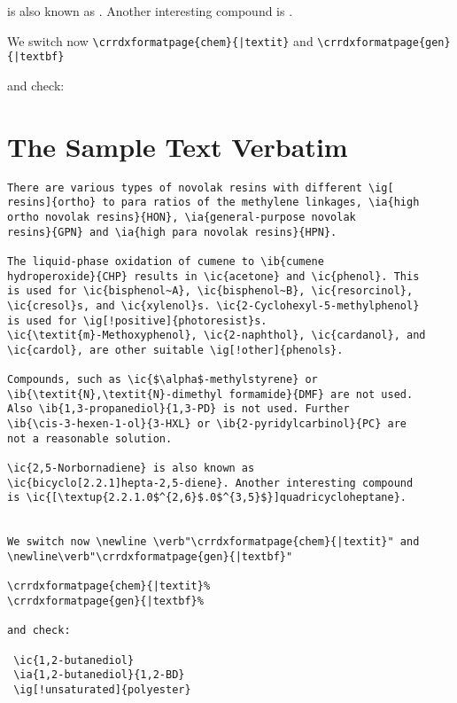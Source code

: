 \documentclass{book}
\begin{document}
 is also known as
. Another interesting compound
is .


We switch now \newline \verb"\crrdxformatpage{chem}{|textit}" and
\newline\verb"\crrdxformatpage{gen}{|textbf}"

%
%

and check:



\section{The Sample Text Verbatim}

\begin{verbatim}
There are various types of novolak resins with different \ig[
resins]{ortho} to para ratios of the methylene linkages, \ia{high
ortho novolak resins}{HON}, \ia{general-purpose novolak
resins}{GPN} and \ia{high para novolak resins}{HPN}.

The liquid-phase oxidation of cumene to \ib{cumene
hydroperoxide}{CHP} results in \ic{acetone} and \ic{phenol}. This
is used for \ic{bisphenol~A}, \ic{bisphenol~B}, \ic{resorcinol},
\ic{cresol}s, and \ic{xylenol}s. \ic{2-Cyclohexyl-5-methylphenol}
is used for \ig[!positive]{photoresist}s.
\ic{\textit{m}-Methoxyphenol}, \ic{2-naphthol}, \ic{cardanol}, and
\ic{cardol}, are other suitable \ig[!other]{phenols}.

Compounds, such as \ic{$\alpha$-methylstyrene} or
\ib{\textit{N},\textit{N}-dimethyl formamide}{DMF} are not used.
Also \ib{1,3-propanediol}{1,3-PD} is not used. Further
\ib{\cis-3-hexen-1-ol}{3-HXL} or \ib{2-pyridylcarbinol}{PC} are
not a reasonable solution.

\ic{2,5-Norbornadiene} is also known as
\ic{bicyclo[2.2.1]hepta-2,5-diene}. Another interesting compound
is \ic{[\textup{2.2.1.0$^{2,6}$.0$^{3,5}$}]quadricycloheptane}.


We switch now \newline \verb"\crrdxformatpage{chem}{|textit}" and
\newline\verb"\crrdxformatpage{gen}{|textbf}"

\crrdxformatpage{chem}{|textit}%
\crrdxformatpage{gen}{|textbf}%

and check:

 \ic{1,2-butanediol}
 \ia{1,2-butanediol}{1,2-BD}
 \ig[!unsaturated]{polyester}


\end{verbatim}




%
%
%

  \printindex
\end{document}
